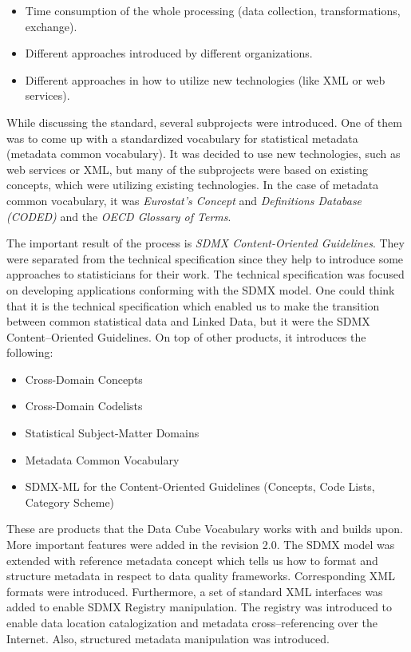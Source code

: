 \begin{itemize}
\item Time consumption of the whole processing (data collection, transformations, 
exchange).
\item Different approaches introduced by different organizations.
\item Different approaches in how to utilize new technologies (like XML or web 
services).
\end{itemize}

While discussing the standard, several subprojects were introduced. One of them was to come
up with a standardized vocabulary for statistical metadata (metadata common vocabulary). It was
decided to use new technologies, such as web services or XML, but many of the subprojects
were based on existing concepts, which were utilizing existing technologies. In the case of
metadata common vocabulary, it was \emph{Eurostat’s Concept} and
\emph{Definitions Database (CODED)} and the \emph{OECD Glossary of Terms}.

The important result of the process is \emph{SDMX Content-Oriented Guidelines}.
They were separated
from the technical specification since they help to introduce some approaches to statisticians
for their work. The technical specification was focused on developing applications
conforming with the SDMX model. One could think that it is the technical specification
which enabled us to make the transition between common statistical data and Linked Data,
but it were the SDMX Content--Oriented Guidelines. On top of other products, it introduces the
following:

\begin{itemize}
\item Cross-Domain Concepts
\item Cross-Domain Codelists
\item Statistical Subject-Matter Domains
\item Metadata Common Vocabulary
\item SDMX-ML for the Content-Oriented Guidelines (Concepts, Code Lists, Category Scheme)
\end{itemize}

These are products that the Data Cube Vocabulary works with and builds upon. More important
features were added in the revision 2.0. The SDMX model was extended with reference metadata
concept which tells us how to format and structure metadata in respect to data quality
frameworks. Corresponding XML formats were introduced. Furthermore, a set of standard XML
interfaces was added to enable SDMX Registry manipulation. The registry was introduced to
enable data location catalogization and metadata cross--referencing over the Internet. Also,
structured metadata manipulation was introduced.

